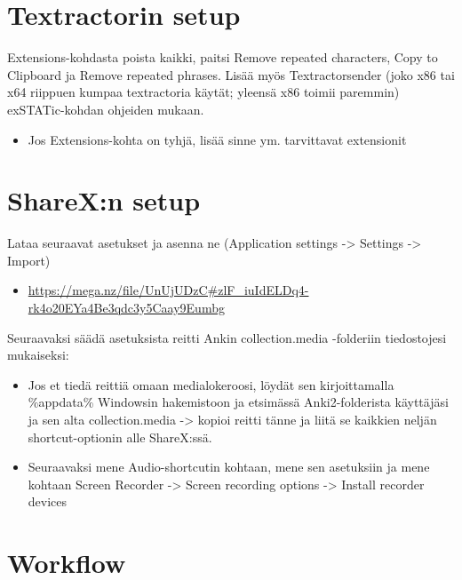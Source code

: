 \documentclass[
]{book}
\providecommand{\tightlist}{%
  \setlength{\itemsep}{0pt}\setlength{\parskip}{0pt}}
\begin{document}
\section{Textractorin setup}\label{textractorin-setup}

Extensions-kohdasta poista kaikki, paitsi Remove repeated characters, Copy to Clipboard ja Remove repeated phrases. Lisää myös Textractorsender (joko x86 tai x64 riippuen kumpaa textractoria käytät; yleensä x86 toimii paremmin) exSTATic-kohdan ohjeiden mukaan.

\begin{itemize}
\tightlist
\item
  Jos Extensions-kohta on tyhjä, lisää sinne ym. tarvittavat extensionit
\end{itemize}

\section{ShareX:n setup}\label{sharexn-setup}

Lataa seuraavat asetukset ja asenna ne (Application settings -\textgreater{} Settings -\textgreater{} Import)

\begin{itemize}
\tightlist
\item
  \url{https://mega.nz/file/UnUjUDzC\#zlF_iuIdELDq4-rk4o20EYa4Be3qdc3y5Caay9Eumbg}
\end{itemize}

Seuraavaksi säädä asetuksista reitti Ankin collection.media -folderiin tiedostojesi mukaiseksi:

\begin{itemize}
\item
  Jos et tiedä reittiä omaan medialokeroosi, löydät sen kirjoittamalla \%appdata\% Windowsin hakemistoon ja etsimässä Anki2-folderista käyttäjäsi ja sen alta collection.media -\textgreater{} kopioi reitti tänne ja liitä se kaikkien neljän shortcut-optionin alle ShareX:ssä.
\item
  Seuraavaksi mene Audio-shortcutin kohtaan, mene sen asetuksiin ja mene kohtaan Screen Recorder -\textgreater{} Screen recording options -\textgreater{} Install recorder devices
\end{itemize}

\section{Workflow}\label{workflow}
\end{document}
